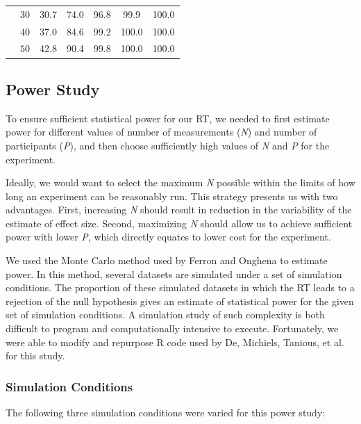 \documentclass[empirical,issue, twocolumn,authordate]{jote-new-article}
\begin{document}
\begin{table}[t!]
\begin{fullwidth}
\begin{tabular}{@{}p{4\smallwidth} p{4\smallwidth} S  S  S  S  S @{}}
& $30$                                                             & 30.7      & 74.0     & 96.8     & 99.9      & 100.0     \\
& $40$                                                              & 37.0      & 84.6     & 99.2     & 100.0     & 100.0     \\
& $50$                                                              & 42.8      & 90.4     & 99.8     & 100.0     & 100.0  
\bottomrule
\end{tabular}
\end{fullwidth}

\end{table}
\subsection{Power Study}

To ensure sufficient statistical power for our RT, we needed to first estimate power for different values of number of measurements (\emph{N}) and number of participants (\emph{P}), and then choose sufficiently high values of \emph{N} and \emph{P} for the experiment. 

Ideally, we would want to select the maximum \emph{N} possible within the limits of how long an experiment can be reasonably run. This strategy presents us with two advantages. First, increasing \emph{N} should result in reduction in the variability of the estimate of effect size. Second, maximizing \emph{N} should allow us to achieve sufficient power with lower \emph{P}, which directly equates to lower cost for the experiment.

We used the Monte Carlo method used by Ferron and Onghena \parencite{Ferron1996} to estimate power. In this method, several datasets are simulated under a set of simulation conditions. The proportion of these simulated datasets in which the RT leads to a rejection of the null hypothesis gives an estimate of statistical power for the given set of simulation conditions. A simulation study of such complexity is both difficult to program and computationally intensive to execute. Fortunately, we were able to modify and repurpose R code used by De, Michiels, Tanious, et al. \parencite{De2020} for this study. 

\subsubsection{Simulation Conditions}

The following three simulation conditions were varied for this power study:
\end{document}

